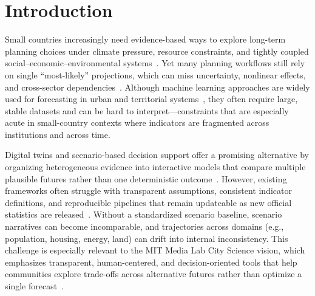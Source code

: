 \documentclass{article}
\begin{document}
\section{Introduction}

Small countries increasingly need evidence-based ways to explore long-term
planning choices under climate pressure, resource constraints, and tightly
coupled social--economic--environmental systems~\cite{riahi2017ssps}. Yet many
planning workflows still rely on single ``most-likely'' projections, which can
miss uncertainty, nonlinear effects, and cross-sector
dependencies~\cite{amer2013scenario}. Although machine learning approaches are
widely used for forecasting in urban and territorial
systems~\cite{batty2018digitaltwins}, they often require large, stable datasets
and can be hard to interpret---constraints that are especially acute in
small-country contexts where indicators are fragmented across institutions and
across time.

Digital twins and scenario-based decision support offer a promising alternative
by organizing heterogeneous evidence into interactive models that compare
multiple plausible futures rather than one deterministic
outcome~\cite{batty2018digitaltwins}. However, existing frameworks often
struggle with transparent assumptions, consistent indicator definitions, and
reproducible pipelines that remain updateable as new official statistics are
released~\cite{udtreview2024}. Without a standardized scenario baseline,
scenario narratives can become incomparable, and trajectories across domains
(e.g., population, housing, energy, land) can drift into internal
inconsistency. This challenge is especially relevant to the MIT Media Lab City
Science vision, which emphasizes transparent, human-centered, and
decision-oriented tools that help communities explore trade-offs across
alternative futures rather than optimize a single
forecast~\cite{alonso2018cityscope,noyman2022cityscope}.
\end{document}
